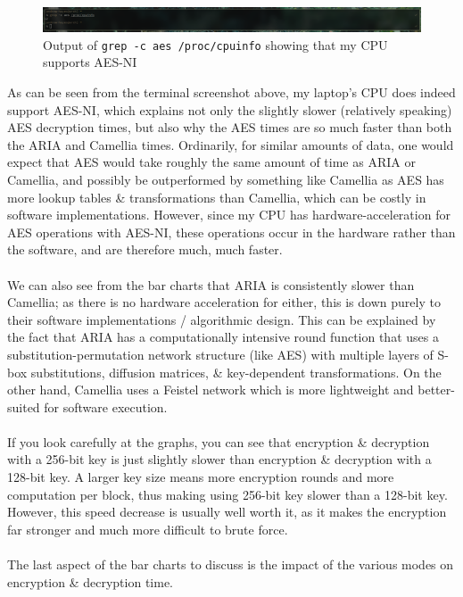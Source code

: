 \documentclass[a4paper]{article}
\begin{document}
\begin{figure}[H]
    \centering
    \includegraphics[width=\textwidth]{./images/aesni.png}
    \caption{Output of \texttt{grep -c aes /proc/cpuinfo} showing that my CPU supports AES-NI}
\end{figure}

As can be seen from the terminal screenshot above, my laptop's CPU does indeed support AES-NI, which explains not only the slightly slower (relatively speaking) AES decryption times, but also why the AES times are so much faster than both the ARIA and Camellia times.
Ordinarily, for similar amounts of data, one would expect that AES would take roughly the same amount of time as ARIA or Camellia, and possibly be outperformed by something like Camellia as AES has more lookup tables \& transformations than Camellia, which can be costly in software implementations.
However, since my CPU has hardware-acceleration for AES operations with AES-NI, these operations occur in the hardware rather than the software, and are therefore much, much faster.
\\\\
We can also see from the bar charts that ARIA is consistently slower than Camellia;
as there is no hardware acceleration for either, this is down purely to their software implementations / algorithmic design.
This can be explained by the fact that ARIA has a computationally intensive round function that uses a substitution-permutation network structure (like AES) with multiple layers of S-box substitutions, diffusion matrices, \& key-dependent transformations.
On the other hand, Camellia uses a Feistel network which is more lightweight and better-suited for software execution.
\\\\
If you look carefully at the graphs, you can see that encryption \& decryption with a 256-bit key is just slightly slower than encryption \& decryption with a 128-bit key.
A larger key size means more encryption rounds and more computation per block, thus making using 256-bit key slower than a 128-bit key.
However, this speed decrease is usually well worth it, as it makes the encryption far stronger and much more difficult to brute force.
\\\\
The last aspect of the bar charts to discuss is the impact of the various modes on encryption \& decryption time.
\end{document}
